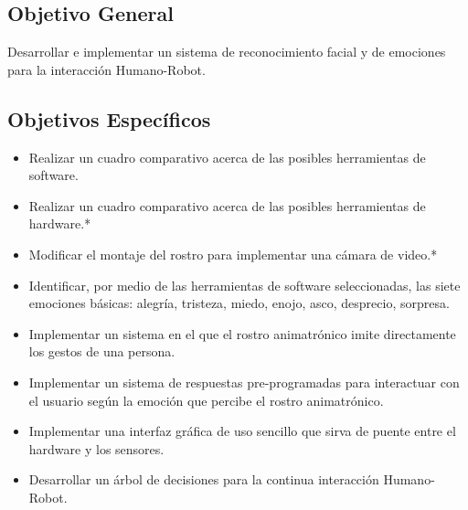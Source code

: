 \subsection*{Objetivo General}
Desarrollar e implementar un sistema de reconocimiento facial y de emociones para la interacción Humano-Robot.

\subsection*{Objetivos Específicos}
\begin{itemize}
\item Realizar un cuadro comparativo acerca de las posibles herramientas de software.
\item Realizar un cuadro comparativo acerca de las posibles herramientas de hardware.*
\item Modificar el montaje del rostro para implementar una cámara de video.*
\item Identificar, por medio de las herramientas de software seleccionadas, las siete emociones básicas: alegría, tristeza, miedo, enojo, asco, desprecio, sorpresa.
\item Implementar un sistema en el que el rostro animatrónico imite directamente los gestos de una persona.
\item Implementar un sistema de respuestas pre-programadas para interactuar con el usuario según la emoción que percibe el rostro animatrónico.
\item Implementar una interfaz gráfica de uso sencillo que sirva de puente entre el hardware y los sensores.
\item Desarrollar un árbol de decisiones para la continua interacción Humano-Robot.
\end{itemize}